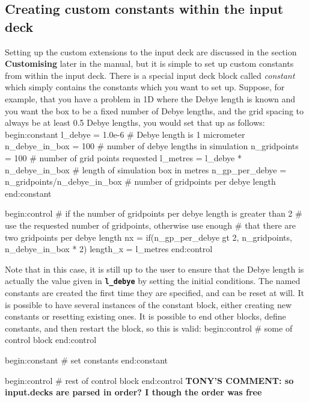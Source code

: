 \documentclass[12pt,a4paper]{article}
\newcommand{\inlinecode}[1]{{\color{warwickred} \bf\texttt{#1}}}
\newcommand{\EPOCH}{{\color{warwickdark}\fontfamily{phv}\selectfont{EPOCH}}}
\newcommand{\tony}[1]{{\color{warwickred} \bf{TONY'S COMMENT:} \bf{#1}}\\}
\newenvironment{boxverbatim}{\lboxverbatim{none}}{\endlboxverbatim}
\begin{document}
\subsection{Creating custom constants within the input deck}
Setting up the custom extensions to the input deck are discussed in the
section {\bf Customising {\EPOCH}} later in the manual, but it is simple to set
up custom constants from within the input deck. There is a special input deck
block called {\it constant} which simply contains the constants which you want
to set up. Suppose, for example, that you have a problem in 1D where the Debye
length is known and you want the box to be a fixed number of Debye lengths,
and the grid spacing to always be at least 0.5 Debye lengths, you would set
that up as follows:
\begin{boxverbatim}
begin:constant
  l_debye = 1.0e-6 # Debye length is 1 micrometer
  n_debye_in_box = 100 # number of debye lengths in simulation
  n_gridpoints = 100 # number of grid points requested
  l_metres = l_debye * n_debye_in_box # length of simulation box in metres
  n_gp_per_debye = n_gridpoints/n_debye_in_box # number of gridpoints per debye length
end:constant

begin:control
  # if the number of gridpoints per debye length is greater than 2
  # use the requested number of gridpoints, otherwise use enough
  # that there are two gridpoints per debye length
  nx = if(n_gp_per_debye gt 2, n_gridpoints, n_debye_in_box * 2)
  length_x = l_metres
end:control
\end{boxverbatim}

Note that in this case, it is still up to the user to ensure that the Debye
length is actually the value given in \inlinecode{l\_debye} by setting the
initial conditions. The named constants are created the first time they are
specified, and can be reset at will. It is possible to have several instances
of the constant block, either creating new constants or resetting existing
ones. It is possible to end other blocks, define constants, and then
restart the block, so this is valid:
\begin{boxverbatim}
begin:control
   # some of control block
end:control

begin:constant
   # set constants
end:constant

begin:control
   # rest of control block
end:control
\end{boxverbatim}
\tony{so input.decks are parsed in order? I though the order was free}
\end{document}
